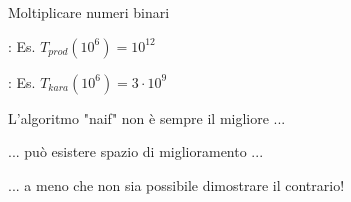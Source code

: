 \begin{frame}{Moltiplicare numeri binari}
    
\vspace{-9pt}
\begin{myboxtitle}
\BIL
\item {}:  Es. $T_{prod}(10^6) = 10^{12}$
\item {}:  Es. $T_{kara}(10^6) = 3 \cdot 10^9$
\EIL
\end{myboxtitle}

\begin{myboxtitle}[Conclusioni]
\BIL
\item L'algoritmo "naif" non è sempre il migliore ...
\item ... può esistere spazio di miglioramento ...
\item ... a meno che non sia possibile dimostrare il contrario!
\EIL
\end{myboxtitle}

\end{frame}

